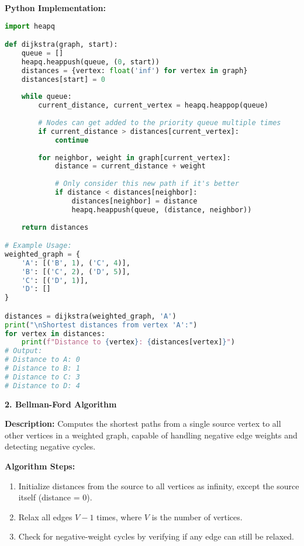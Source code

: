 \textbf{Python Implementation:}

\begin{lstlisting}[language=Python, xleftmargin=0.02\textwidth, xrightmargin=0.02\textwidth]
import heapq

def dijkstra(graph, start):
    queue = []
    heapq.heappush(queue, (0, start))
    distances = {vertex: float('inf') for vertex in graph}
    distances[start] = 0
    
    while queue:
        current_distance, current_vertex = heapq.heappop(queue)
        
        # Nodes can get added to the priority queue multiple times
        if current_distance > distances[current_vertex]:
            continue
        
        for neighbor, weight in graph[current_vertex]:
            distance = current_distance + weight
            
            # Only consider this new path if it's better
            if distance < distances[neighbor]:
                distances[neighbor] = distance
                heapq.heappush(queue, (distance, neighbor))
    
    return distances

# Example Usage:
weighted_graph = {
    'A': [('B', 1), ('C', 4)],
    'B': [('C', 2), ('D', 5)],
    'C': [('D', 1)],
    'D': []
}

distances = dijkstra(weighted_graph, 'A')
print("\nShortest distances from vertex 'A':")
for vertex in distances:
    print(f"Distance to {vertex}: {distances[vertex]}")
# Output:
# Distance to A: 0
# Distance to B: 1
# Distance to C: 3
# Distance to D: 4
\end{lstlisting}

\textbf{2. Bellman-Ford Algorithm}

\textbf{Description:}  
Computes the shortest paths from a single source vertex to all other vertices in a weighted graph, capable of handling negative edge weights and detecting negative cycles.

\textbf{Algorithm Steps:}
\begin{enumerate}
    \item Initialize distances from the source to all vertices as infinity, except the source itself (distance = 0).
    \item Relax all edges \( V - 1 \) times, where \( V \) is the number of vertices.
    \item Check for negative-weight cycles by verifying if any edge can still be relaxed.
\end{enumerate}

